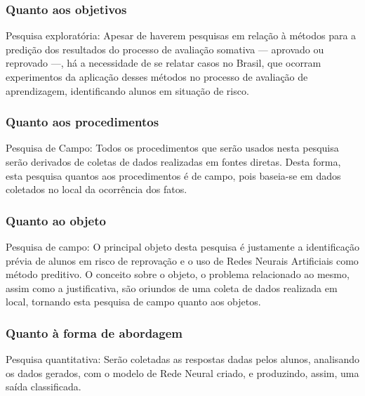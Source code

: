 \documentclass[
	12pt,				%
	openright,			%
	oneside,
	a4paper,			%
	english,			%
	french,				%
	spanish,			%
	brazil,				%
	]{abntex2}
\begin{document}
\subsubsection{Quanto aos objetivos}
Pesquisa exploratória: Apesar de haverem pesquisas em relação à métodos para a predição dos resultados do processo de avaliação somativa --- aprovado ou reprovado ---, há a necessidade de se relatar casos no Brasil, que ocorram experimentos da aplicação desses métodos no processo de avaliação de aprendizagem, identificando alunos em situação de risco.

\subsubsection{Quanto aos procedimentos}
Pesquisa de Campo: Todos os procedimentos que serão usados nesta pesquisa serão derivados de coletas de dados realizadas em fontes diretas. Desta forma, esta pesquisa quantos aos procedimentos é de campo, pois baseia-se em dados coletados no local da ocorrência dos fatos.

\subsubsection{Quanto ao objeto}
Pesquisa de campo: O principal objeto desta pesquisa é justamente a identificação prévia de alunos em risco de reprovação e o uso de Redes Neurais Artificiais como método preditivo. O conceito sobre o objeto, o problema relacionado ao mesmo, assim como a justificativa, são oriundos de uma coleta de dados realizada em local, tornando esta pesquisa de campo quanto aos objetos.

\subsubsection{Quanto à forma de abordagem}
Pesquisa quantitativa: Serão coletadas as respostas dadas pelos alunos, analisando os dados gerados, com o modelo de Rede Neural criado, e produzindo, assim, uma saída classificada.
\end{document}
